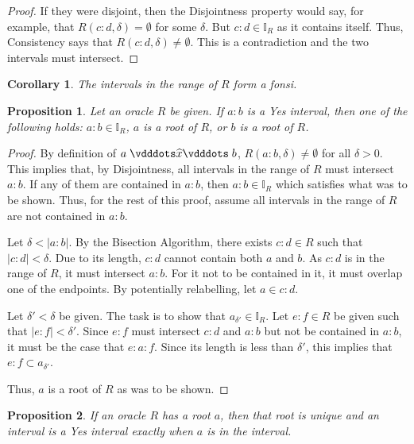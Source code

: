 \documentclass[12pt]{article}
\newtheorem{corollary}{Corollary}[section]
\newtheorem{proposition}{Proposition}[section]
\begin{document}
\begin{proof}
    If they were disjoint, then the Disjointness property would say, for example, that $R(c:d, \delta)= \emptyset$ for some $\delta$. But $c:d \in \mathbb{I}_R$ as it contains itself. Thus, Consistency says that $R(c:d, \delta) \neq \emptyset$. This is a contradiction and the two intervals must intersect. 
\end{proof}

\begin{corollary}
    The intervals in the range of $R$ form a fonsi.
\end{corollary}


\begin{proposition}
    Let an oracle $R$ be given. If $a:b$ is a Yes interval, then one of the following holds: $a:b \in \mathbb{I}_R$, $a$ is a root of $R$, or $b$ is a root of $R$.
\end{proposition}

\begin{proof}
    By definition of $a \xora b$, $R(a:b, \delta) \neq \emptyset$ for all $\delta > 0$. This implies that, by Disjointness, all intervals in the range of $R$ must intersect $a:b$. If any of them are contained in $a:b$, then $a:b \in \mathbb{I}_R$ which satisfies what was to be shown. Thus, for the rest of this proof, assume all intervals in the range of $R$ are not contained in $a:b$.

    Let $ \delta < |a:b|$. By the Bisection Algorithm, there exists $c:d \in R$ such that $|c:d| < \delta$. Due to its length, $c:d$ cannot contain both $a$ and $b$. As $c:d$ is in the range of $R$, it must intersect $a:b$. For it not to be contained in it, it must overlap one of the endpoints. By potentially relabelling, let $a \in c:d$.
    
    Let $\delta' < \delta$ be given. The task is to show that $a_{\delta'} \in \mathbb{I}_R$. Let $e:f \in R$ be given such that $|e:f| < \delta'$. Since $e:f$ must intersect $c:d$ and $a:b$ but not be contained in $a:b$, it must be the case that $e:a:f$. Since its length is less than $\delta'$, this implies that $e:f \subset a_{\delta'}$.

    Thus, $a$ is a root of $R$ as was to be shown. 
\end{proof}

\begin{proposition}
    If an oracle $R$ has a root $a$, then that root is unique and an interval is a Yes interval exactly when $a$ is in the interval.
\end{proposition}
\end{document}
